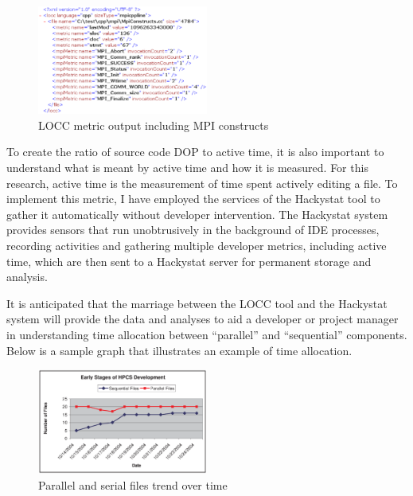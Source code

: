 \pagebreak
\begin{figure}
  \includegraphics[width=0.5\textwidth]{locc_output.eps}
  \caption{LOCC metric output including MPI constructs}
  \label{fig:LOCCOutput}
\end{figure}

To create the ratio of source code DOP to active time, it is also
important to understand what is meant by active time and how it is
measured.  For this research, active time is the measurement of time
spent actively editing a file.  To implement this metric, I have
employed the services of the Hackystat tool to gather it automatically
without developer intervention.  The Hackystat system provides sensors
that run unobtrusively in the background of IDE processes, recording
activities and gathering multiple developer metrics, including active
time, which are then sent to a Hackystat server for permanent storage
and analysis.

It is anticipated that the marriage between the LOCC tool and the
Hackystat system will provide the data and analyses to aid a developer
or project manager in understanding time allocation between
``parallel'' and ``sequential'' components.  Below is a sample graph
that illustrates an example of time allocation.

\begin{figure}[h]
  \includegraphics[width=0.5\textwidth]{DOP_ratio.eps}
  \caption{Parallel and serial files trend over time}
  \label{fig:DOPRatio}
\end{figure}
\pagebreak